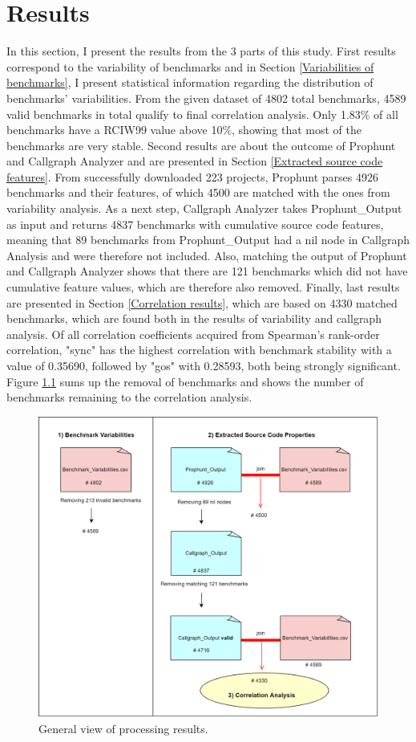 \documentclass{seal_thesis}
\begin{document}
\chapter{Results}
\label{Results}
In this section, I present the results from the 3 parts of this study. First results correspond to the variability of benchmarks and in Section \ref{Variabilities of benchmarks}, I present statistical information regarding the distribution of benchmarks' variabilities. From the given dataset of 4802 total benchmarks, 4589 valid benchmarks in total qualify to final correlation analysis. Only 1.83\% of all benchmarks have a RCIW99 value above 10\%, showing that most of the benchmarks are very stable. Second results are about the outcome of Prophunt and Callgraph Analyzer and are presented in Section \ref{Extracted source code features}. From successfully downloaded 223 projects, Prophunt parses 4926 benchmarks and their features, of which 4500 are matched with the ones from variability analysis. As a next step, Callgraph Analyzer takes Prophunt\_Output as input and returns 4837 benchmarks with cumulative source code features, meaning that 89 benchmarks from Prophunt\_Output had a nil node in Callgraph Analysis and were therefore not included. Also, matching the output of Prophunt and Callgraph Analyzer shows that there are 121 benchmarks which did not have cumulative feature values, which are therefore also removed. Finally, last results are presented in Section \ref{Correlation results}, which are based on 4330 matched benchmarks, which are found both in the results of variability and callgraph analysis. Of all correlation coefficients acquired from Spearman's rank-order correlation, "sync" has the highest correlation with benchmark stability with a value of 0.35690, followed by "gos" with 0.28593, both being strongly significant. Figure \ref{fig:results} sums up the removal of benchmarks and shows the number of benchmarks remaining to the correlation analysis.

\begin{figure}[H]
	\centering
	\includegraphics[width=\linewidth]{ResultsGeneral}
	\caption{General view of processing results.}
	\label{fig:results}
\end{figure}
\end{document}
